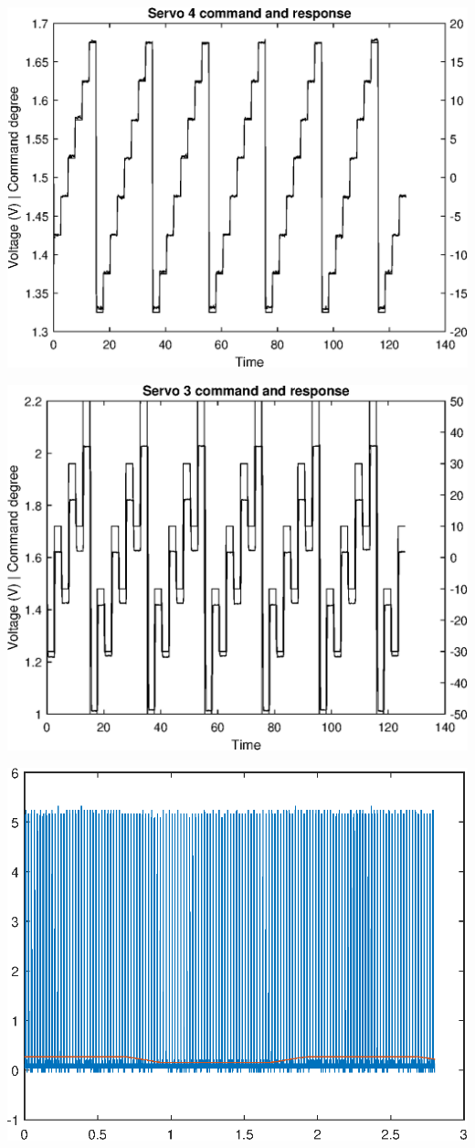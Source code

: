 \includegraphics[width=\SchematicWidth]{images/Servos/ramp.eps}

\includegraphics[width=\SchematicWidth]{images/Servos/random.eps}

\includegraphics[width=\SchematicWidth]{images/Servos/time-domain-response.eps}
